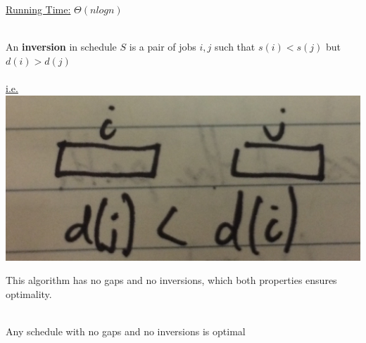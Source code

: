 \documentclass[12pt]{article}
\begin{document}
\underline{Running Time:} $\Theta (nlogn)$\\
\\
\begin{tcolorbox}[title=Inversion]
	An \textbf{inversion} in schedule $S$ is a pair of jobs $i,j$ such that $s(i) < s(j)$ but $d(i) > d(j)$\\
	\\
	\underline{i.e.}\\
	 \includegraphics[scale=0.1]{minmax2}
\end{tcolorbox}

This algorithm has no gaps and no inversions, which both properties ensures optimality.\\
\\

\begin{tcolorbox}[title=Theorem]
	Any schedule with no gaps and no inversions is optimal
\end{tcolorbox}
\end{document}
